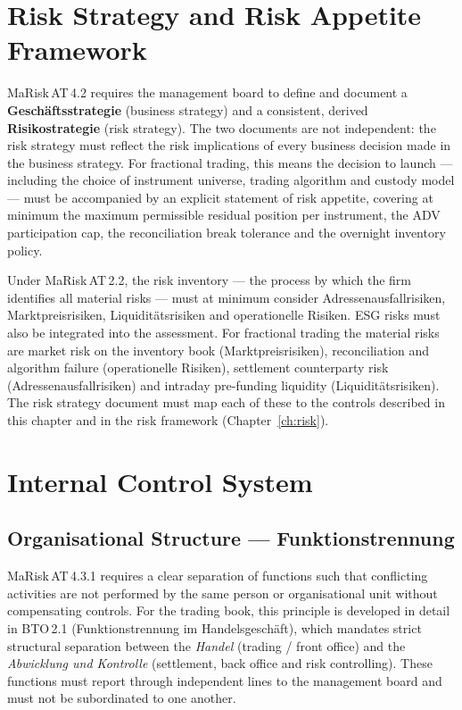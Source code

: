\documentclass[12pt,a4paper]{report}
\begin{document}
\section{Risk Strategy and Risk Appetite Framework}
\label{sec:riskstrategy}

MaRisk\,AT\,4.2 requires the management board to define and document a
\textbf{Gesch{\"a}ftsstrategie} (business strategy) and a consistent, derived
\textbf{Risikostrategie} (risk strategy). The two documents are not independent:
the risk strategy must reflect the risk implications of every business decision
made in the business strategy. For fractional trading, this means the decision
to launch --- including the choice of instrument universe, trading algorithm and
custody model --- must be accompanied by an explicit statement of risk appetite,
covering at minimum the maximum permissible residual position per instrument,
the ADV participation cap, the reconciliation break tolerance and the overnight
inventory policy.

Under MaRisk\,AT\,2.2, the risk inventory --- the process by which the firm
identifies all material risks --- must at minimum consider Adressenausfallrisiken,
Marktpreisrisiken, Liquidit{\"a}tsrisiken and operationelle Risiken. ESG risks
must also be integrated into the assessment. For fractional trading the material
risks are market risk on the inventory book (Marktpreisrisiken), reconciliation
and algorithm failure (operationelle Risiken), settlement counterparty risk
(Adressenausfallrisiken) and intraday pre-funding liquidity
(Liquidit{\"a}tsrisiken). The risk strategy document must map each of these to
the controls described in this chapter and in the risk framework
(Chapter~\ref{ch:risk}).

\section{Internal Control System}
\label{sec:ics}

\subsection{Organisational Structure --- Funktionstrennung}

MaRisk\,AT\,4.3.1 requires a clear separation of functions such that
conflicting activities are not performed by the same person or organisational
unit without compensating controls. For the trading book, this principle is
developed in detail in BTO\,2.1 (Funktionstrennung im Handelsgesch{\"a}ft),
which mandates strict structural separation between the \textit{Handel} (trading
/ front office) and the \textit{Abwicklung und Kontrolle} (settlement, back
office and risk controlling). These functions must report through independent
lines to the management board and must not be subordinated to one another.
\end{document}

